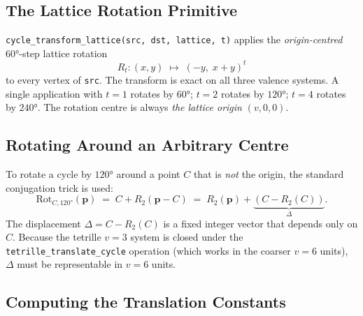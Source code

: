 \documentclass[10pt,a4paper]{article}
\let\polysubsection\subsection
\renewcommand\subsection{\needspace{0.12\textheight}\polysubsection}
\newcommand{\code}[1]{\texttt{\small #1}}
\begin{document}
\subsection{The Lattice Rotation Primitive}

\code{cycle\_transform\_lattice(src, dst, lattice, t)} applies the
\emph{origin-centred} 60°-step lattice rotation
\[
  R_t: (x, y) \;\longmapsto\; (-y,\; x+y)^t
\]
to every vertex of \code{src}.  The transform is exact on all three valence
systems.  A single application with $t=1$ rotates by $60°$; $t=2$ rotates
by $120°$; $t=4$ rotates by $240°$.  The rotation centre is always
\emph{the lattice origin} $(v, 0, 0)$.

\subsection{Rotating Around an Arbitrary Centre}

To rotate a cycle by $120°$ around a point $C$ that is \emph{not} the
origin, the standard conjugation trick is used:
\[
  \text{Rot}_{C,120°}(\mathbf{p})
  \;=\; C + R_2(\mathbf{p} - C)
  \;=\; R_2(\mathbf{p}) + \underbrace{(C - R_2(C))}_{\Delta}.
\]
The displacement $\Delta = C - R_2(C)$ is a fixed integer vector that depends
only on $C$.  Because the tetrille $v=3$ system is closed under the
\code{tetrille\_translate\_cycle} operation (which works in the coarser $v=6$
units), $\Delta$ must be representable in $v=6$ units.

\subsection{Computing the Translation Constants}
\end{document}
